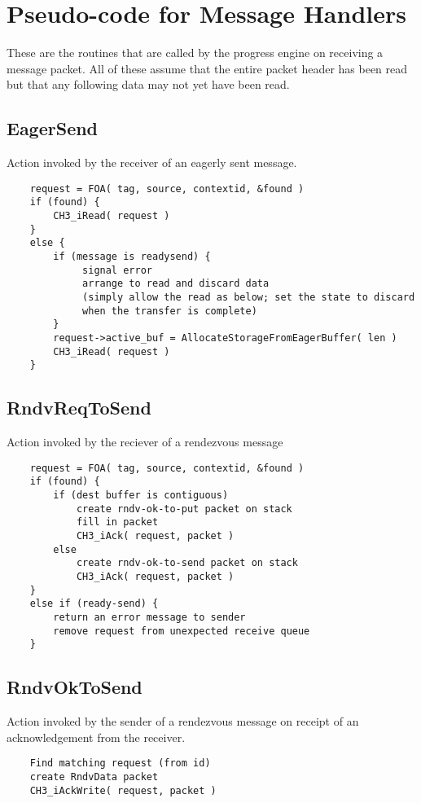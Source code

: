 \documentclass{article}
\begin{document}
\section{Pseudo-code for Message Handlers}
These are the routines that are called by the progress engine on receiving a
message packet.  All of these assume that the entire packet header has been 
read but that any following data may not yet have been read.

\subsection{EagerSend}
Action invoked by the receiver of an eagerly sent message.
\begin{verbatim}
    request = FOA( tag, source, contextid, &found )
    if (found) {
        CH3_iRead( request )
    }
    else {
        if (message is readysend) {
             signal error 
             arrange to read and discard data 
             (simply allow the read as below; set the state to discard
             when the transfer is complete)
        }
        request->active_buf = AllocateStorageFromEagerBuffer( len )
        CH3_iRead( request )
    }
\end{verbatim}

\subsection{RndvReqToSend}
Action invoked by the reciever of a rendezvous message
\begin{verbatim}
    request = FOA( tag, source, contextid, &found )
    if (found) {
        if (dest buffer is contiguous)
            create rndv-ok-to-put packet on stack
            fill in packet
            CH3_iAck( request, packet )
        else
            create rndv-ok-to-send packet on stack
            CH3_iAck( request, packet )
    }
    else if (ready-send) {
        return an error message to sender
        remove request from unexpected receive queue
    }
\end{verbatim}

\subsection{RndvOkToSend}
Action invoked by the sender of a rendezvous message on receipt of an
acknowledgement from the receiver.
\begin{verbatim}
    Find matching request (from id)
    create RndvData packet
    CH3_iAckWrite( request, packet )
\end{verbatim}
\end{document}

